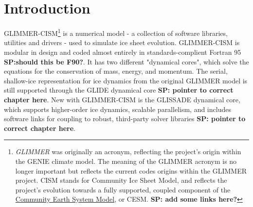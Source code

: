 
\section{Introduction}
%
GLIMMER-CISM\footnote{{\it GLIMMER} was originally an acronym, reflecting the project's origin within the GENIE climate model. The meaning of the GLIMMER acronym is no longer important but reflects the current codes origins within the GLIMMER project. CISM stands for Community Ice Sheet Model, and reflects the project's evolution towards a fully supported, coupled component of the \href{http://www2.cesm.ucar.edu/}{Community Earth System Model}, or CESM. {\bf SP: add some links here?}} is a numerical model - a collection of software libraries, utilities and drivers  - used to simulate ice sheet evolution. GLIMMER-CISM is modular in design and coded almost entirely in standards-complient Fortran 95 \textbf{SP:should this be F90?}. It has two different "dynamical cores", which solve the equations for the conservation of mass, energy, and momentum. The serial, shallow-ice representation for ice dynamics from the original GLIMMER model is still supported through the GLIDE dynamical core \textbf{SP: pointer to correct chapter here}. New with GLIMMER-CISM is the GLISSADE dynamical core, which supports higher-order ice dynamics, scalable parallelism, and includes software links for coupling to robust, third-party solver libraries \textbf{SP: pointer to correct chapter here}. 
%
